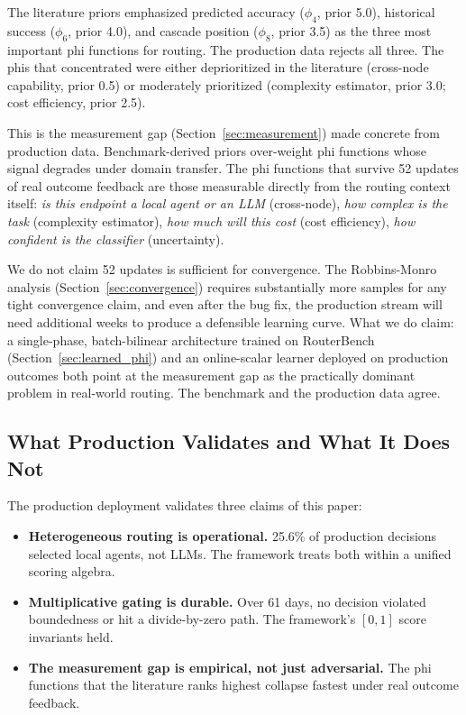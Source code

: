 The literature priors emphasized predicted accuracy ($\phi_4$, prior 5.0), historical success ($\phi_6$, prior 4.0), and cascade position ($\phi_8$, prior 3.5) as the three most important phi functions for routing. The production data rejects all three. The phis that concentrated were either deprioritized in the literature (cross-node capability, prior 0.5) or moderately prioritized (complexity estimator, prior 3.0; cost efficiency, prior 2.5).

This is the measurement gap (Section~\ref{sec:measurement}) made concrete from production data. Benchmark-derived priors over-weight phi functions whose signal degrades under domain transfer. The phi functions that survive 52 updates of real outcome feedback are those measurable directly from the routing context itself: \emph{is this endpoint a local agent or an LLM} (cross-node), \emph{how complex is the task} (complexity estimator), \emph{how much will this cost} (cost efficiency), \emph{how confident is the classifier} (uncertainty).

We do not claim 52 updates is sufficient for convergence. The Robbins-Monro analysis (Section~\ref{sec:convergence}) requires substantially more samples for any tight convergence claim, and even after the bug fix, the production stream will need additional weeks to produce a defensible learning curve. What we do claim: a single-phase, batch-bilinear architecture trained on RouterBench (Section~\ref{sec:learned_phi}) and an online-scalar learner deployed on production outcomes both point at the measurement gap as the practically dominant problem in real-world routing. The benchmark and the production data agree.

\subsection{What Production Validates and What It Does Not}

The production deployment validates three claims of this paper:

\begin{itemize}
    \item \textbf{Heterogeneous routing is operational.} 25.6\% of production decisions selected local agents, not LLMs. The framework treats both within a unified scoring algebra.
    \item \textbf{Multiplicative gating is durable.} Over 61 days, no decision violated boundedness or hit a divide-by-zero path. The framework's $[0, 1]$ score invariants held.
    \item \textbf{The measurement gap is empirical, not just adversarial.} The phi functions that the literature ranks highest collapse fastest under real outcome feedback.
\end{itemize}

